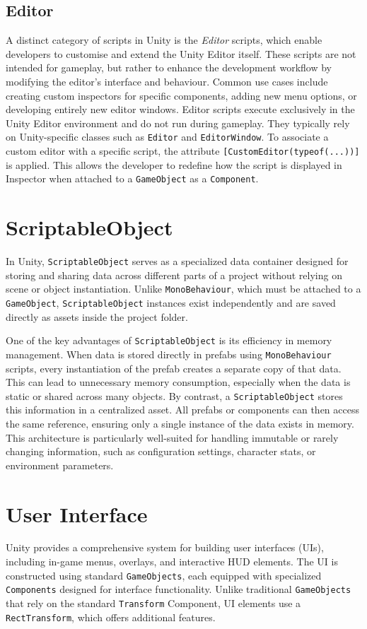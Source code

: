 \subsection{Editor}
A distinct category of scripts in Unity is the \textit{Editor} scripts, which enable developers to customise and extend the Unity Editor itself. These scripts are not intended for gameplay, but rather to enhance the development workflow by modifying the editor’s interface and behaviour. Common use cases include creating custom inspectors for specific components, adding new menu options, or developing entirely new editor windows. Editor scripts execute exclusively in the Unity Editor environment and do not run during gameplay. They typically rely on Unity-specific classes such as \verb|Editor| and \verb|EditorWindow|. To associate a custom editor with a specific script, the attribute \verb|[CustomEditor(typeof(...))]| is applied. This allows the developer to redefine how the script is displayed in Inspector when attached to a \verb|GameObject| as a \verb|Component|.


 \section{ScriptableObject}
In Unity, \verb|ScriptableObject| serves as a specialized data container designed for storing and sharing data across different parts of a project without relying on scene or object instantiation. Unlike \verb|MonoBehaviour|, which must be attached to a \verb|GameObject|, \verb|ScriptableObject| instances exist independently and are saved directly as assets inside the project folder.

One of the key advantages of \verb|ScriptableObject| is its efficiency in memory management. When data is stored directly in prefabs using \verb|MonoBehaviour| scripts, every instantiation of the prefab creates a separate copy of that data. This can lead to unnecessary memory consumption, especially when the data is static or shared across many objects. By contrast, a \verb|ScriptableObject| stores this information in a centralized asset. All prefabs or components can then access the same reference, ensuring only a single instance of the data exists in memory. This architecture is particularly well-suited for handling immutable or rarely changing information, such as configuration settings, character stats, or environment parameters.

\section{User Interface}
Unity provides a comprehensive system for building user interfaces (UIs), including in-game menus, overlays, and interactive HUD elements. The UI is constructed using standard \verb|GameObjects|, each equipped with specialized \verb|Components| designed for interface functionality. Unlike traditional \verb|GameObjects| that rely on the standard \verb|Transform| Component, UI elements use a \verb|RectTransform|, which offers additional features.

